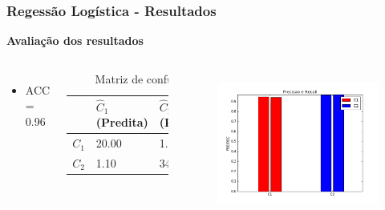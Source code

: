 \documentclass{beamer}
\begin{document}
\begin{frame}
\frametitle{Regessão Logística - Resultados}

\textbf{Avaliação dos resultados}
\begin{columns}[c] 
\begin{itemize}
\item ACC = 0.96
\end{itemize}

\begin{table}
\begin{tabular}{l l l}
\toprule
 & \textbf{$\hat{C}_1$ (Predita)} & \textbf{$\hat{C}_2$(Predita)}\\
\midrule
$C_1$ & 20.00&1.20\\ 
$C_2$ & 1.10&34.60\\ 

\bottomrule
\end{tabular}
\caption{Matriz de confusão}
\end{table}


\begin{figure}[H]
\centering
  \includegraphics[width=\linewidth]{../img/log_reg_rec.png}
  \label{fig:percep}
\end{figure}%

\end{columns}

\end{frame}
\end{document}
